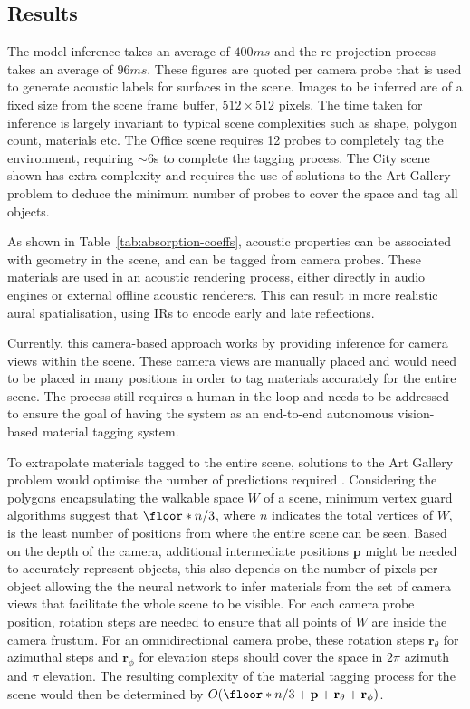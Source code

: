 \subsection{Results}
The model inference takes an average of $400 ms$ and the re-projection process takes an average of $96ms$. These figures are quoted per camera probe that is used to generate acoustic labels for surfaces in the scene. Images to be inferred are of a fixed size from the scene frame buffer, $512 \times 512$ pixels. The time taken for inference is largely invariant to typical scene complexities such as shape, polygon count, materials etc. The Office scene requires 12 probes to completely tag the environment, requiring $\sim$6s to complete the tagging process. The City scene shown has extra complexity and requires the use of solutions to the Art Gallery problem to deduce the minimum number of probes to cover the space and tag all objects.\par
As shown in Table~\ref{tab:absorption-coeffs}, acoustic properties can be associated with geometry in the scene, and can be tagged from camera probes. These materials are used in an acoustic rendering process, either directly in audio engines or external offline acoustic renderers. This can result in more realistic aural spatialisation, using IRs to encode early and late reflections.\par
Currently, this camera-based approach works by providing inference for camera views within the scene. These camera views are manually placed and would need to be placed in many positions in order to tag materials accurately for the entire scene. The process still requires a human-in-the-loop and needs to be addressed to ensure the goal of having the system as an end-to-end autonomous vision-based material tagging system.\par
To extrapolate materials tagged to the entire scene, solutions to the Art Gallery problem would optimise the number of predictions required \cite{devadoss2011discrete, bajuelos2008optimizing}. Considering the polygons encapsulating the walkable space $W$ of a scene, minimum vertex guard algorithms suggest that $\floor*{n/3}$, where $n$ indicates the total vertices of $W$, is the least number of positions from where the entire scene can be seen. Based on the depth of the camera, additional intermediate positions $\textbf{p}$ might be needed to accurately represent objects, this also depends on the number of pixels per object allowing the the neural network to infer materials from the set of camera views that facilitate the whole scene to be visible. For each camera probe position, rotation steps are needed to ensure that all points of $W$ are inside the camera frustum. For an omnidirectional camera probe, these rotation steps $\textbf{r}_\theta$ for azimuthal steps and $\textbf{r}_\phi$ for elevation steps should cover the space in $2\pi$ azimuth and $\pi$ elevation. The resulting complexity of the material tagging process for the scene would then be determined by $O(\floor*{n/3} + \textbf{p} + \textbf{r}_\theta + \textbf{r}_\phi)$.


